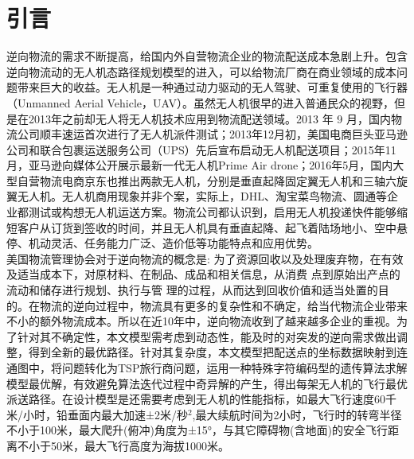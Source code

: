 \documentclass[twocolumn]{jbuaa}
\begin{document}
	\wuhao 


	\enlargethispage{-3.3cm}
	\section{引言}
	逆向物流的需求不断提高，给国内外自营物流企业的物流配送成本急剧上升。包含逆向物流动的无人机态路径规划模型的进入，可以给物流厂商在商业领域的成本问题带来巨大的收益。无人机是一种通过动力驱动的无人驾驶、可重复使用的飞行器（Unmanned Aerial Vehicle，UAV）。虽然无人机很早的进入普通民众的视野，但是在2013年之前却无人将无人机技术应用到物流配送领域。2013 年 9
	月，国内物流公司顺丰速运首次进行了无人机派件测试；2013年12月初，美国电商巨头亚马逊公司和联合包裹运送服务公司（UPS）先后宣布启动无人机配送项目；2015年11月，亚马逊向媒体公开展示最新一代无人机Prime Air drone；2016年5月，国内大型自营物流电商京东也推出两款无人机，分别是垂直起降固定翼无人机和三轴六旋翼无人机。无人机商用现象并非个案，实际上，DHL、淘宝菜鸟物流、圆通等企业都测试或构想无人机运送方案。物流公司都认识到，启用无人机投递快件能够缩短客户从订货到签收的时间，并且无人机具有垂直起降、起飞着陆场地小、空中悬停、机动灵活、任务能力广泛、造价低等功能特点和应用优势。
	\\\indent{}美国物流管理协会对于逆向物流的概念是: 为了资源回收以及处理废弃物，在有效及适当成本下，对原材料、在制品、成品和相关信息，从消费 点到原始出产点的流动和储存进行规划、执行与管 理的过程，从而达到回收价值和适当处置的目的。在物流的逆向过程中，物流具有更多的复杂性和不确定，给当代物流企业带来不小的额外物流成本。所以在近10年中，逆向物流收到了越来越多企业的重视。为了针对其不确定性，本文模型需考虑到动态性，能及时的对突发的逆向需求做出调整，得到全新的最优路径。针对其复杂度，本文模型把配送点的坐标数据映射到连通图中，将问题转化为TSP旅行商问题，运用一种特殊字符编码型的遗传算法求解模型最优解，有效避免算法迭代过程中奇异解的产生，得出每架无人机的飞行最优派送路径。在设计模型是还需要考虑到无人机的性能指标，如最大飞行速度60千米/小时，铅垂面内最大加速±2米/秒$^{2}$,最大续航时间为2小时，飞行时的转弯半径不小于100米，最大爬升(俯冲)角度为±15°，与其它障碍物(含地面)的安全飞行距离不小于50米，最大飞行高度为海拔1000米。
	\enlargethispage{-3.3cm}
\end{document}
